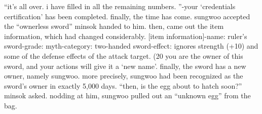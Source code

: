 “it’s all over.
 i have filled in all the remaining numbers.
”-your ‘credentials certification’ has been completed.
finally, the time has come.
sungwoo accepted the “ownerless sword” minsok handed to him.
then, came out the item information, which had changed considerably.
[item information]-name: ruler’s sword-grade: myth-category: two-handed sword-effect: ignores strength (+10) and some of the defense effects of the attack target.
 (20%
you are the owner of this sword, and your actions will give it a ‘new name’.
finally, the sword has a new owner, namely sungwoo.
more precisely, sungwoo had been recognized as the sword’s owner in exactly 5,000 days.
“then, is the egg about to hatch soon?” minsok asked.
nodding at him, sungwoo pulled out an “unknown egg” from the bag.


 